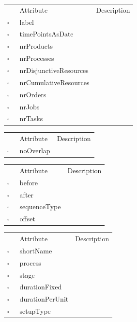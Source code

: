 \begin{table}
\caption{Problem  }

\begin{longtable}{llp{8cm}}
& Attribute & Description \\
$\square$\ & label &  \\
$\square$\ & timePointsAsDate &  \\
$\square$\ & nrProducts &  \\
$\square$\ & nrProcesses &  \\
$\square$\ & nrDisjunctiveResources &  \\
$\square$\ & nrCumulativeResources &  \\
$\square$\ & nrOrders &  \\
$\square$\ & nrJobs &  \\
$\square$\ & nrTasks &  \\
\end{longtable}
\label{attr:Problem}
\end{table}

\begin{table}
\caption{Process  }

\begin{longtable}{llp{8cm}}
& Attribute & Description \\
$\square$\ & noOverlap &  \\
\end{longtable}
\label{attr:Process}
\end{table}

\begin{table}
\caption{ProcessSequence  }

\begin{longtable}{llp{8cm}}
& Attribute & Description \\
$\square$\ & before &  \\
$\square$\ & after &  \\
$\square$\ & sequenceType &  \\
$\square$\ & offset &  \\
\end{longtable}
\label{attr:ProcessSequence}
\end{table}

\begin{table}
\caption{ProcessStep  }

\begin{longtable}{llp{8cm}}
& Attribute & Description \\
$\square$\ & shortName &  \\
$\square$\ & process &  \\
$\square$\ & stage &  \\
$\square$\ & durationFixed &  \\
$\square$\ & durationPerUnit &  \\
$\square$\ & setupType &  \\
\end{longtable}
\label{attr:ProcessStep}
\end{table}

